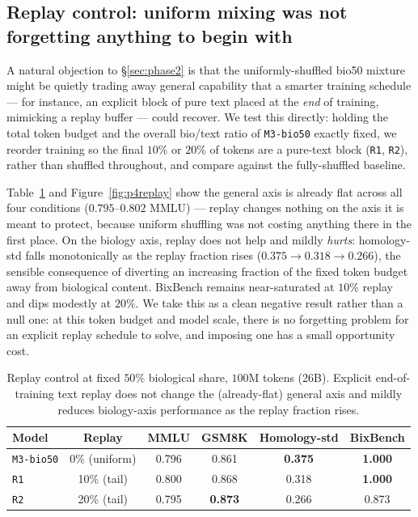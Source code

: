 \subsection{Replay control: uniform mixing was not forgetting anything to begin with}
\label{sec:replay}
A natural objection to \S\ref{sec:phase2} is that the uniformly-shuffled bio50 mixture might be
quietly trading away general capability that a smarter training schedule --- for instance, an
explicit block of pure text placed at the \emph{end} of training, mimicking a replay buffer ---
could recover. We test this directly: holding the total token budget and the overall bio/text
ratio of \texttt{M3-bio50} exactly fixed, we reorder training so the final $10\%$ or $20\%$ of
tokens are a pure-text block (\texttt{R1}, \texttt{R2}), rather than shuffled throughout, and
compare against the fully-shuffled baseline.

Table~\ref{tab:p4replay} and Figure~\ref{fig:p4replay} show the general axis is already flat
across all four conditions ($0.795$--$0.802$ MMLU) --- replay changes nothing on the axis it is
meant to protect, because uniform shuffling was not costing anything there in the first place.
On the biology axis, replay does not help and mildly \emph{hurts}: homology-std falls
monotonically as the replay fraction rises ($0.375\!\to\!0.318\!\to\!0.266$), the sensible
consequence of diverting an increasing fraction of the fixed token budget away from biological
content. BixBench remains near-saturated at $10\%$ replay and dips modestly at $20\%$. We take
this as a clean negative result rather than a null one: at this token budget and model scale,
there is no forgetting problem for an explicit replay schedule to solve, and imposing one has a
small opportunity cost.

\begin{table}[h]\centering\small
\caption{Replay control at fixed $50\%$ biological share, $100$M tokens (26B). Explicit
end-of-training text replay does not change the (already-flat) general axis and mildly reduces
biology-axis performance as the replay fraction rises.}
\label{tab:p4replay}
\begin{tabular}{lccccc}
\toprule
Model & Replay & MMLU & GSM8K & Homology-std & BixBench \\
\midrule
\texttt{M3-bio50} & 0\% (uniform) & 0.796 & 0.861 & \textbf{0.375} & \textbf{1.000} \\
\texttt{R1} & 10\% (tail) & 0.800 & 0.868 & 0.318 & \textbf{1.000} \\
\texttt{R2} & 20\% (tail) & 0.795 & \textbf{0.873} & 0.266 & 0.873 \\
\bottomrule
\end{tabular}
\end{table}

